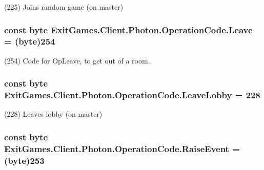(225) Joins random game (on master)

\subsubsection[{\texorpdfstring{Leave}{Leave}}]{\setlength{\rightskip}{0pt plus 5cm}const byte Exit\+Games.\+Client.\+Photon.\+Operation\+Code.\+Leave = (byte)254}\hypertarget{class_exit_games_1_1_client_1_1_photon_1_1_operation_code_aa11e391e152516015f509f474f6ac7ce}{}\label{class_exit_games_1_1_client_1_1_photon_1_1_operation_code_aa11e391e152516015f509f474f6ac7ce}


(254) Code for Op\+Leave, to get out of a room.

\subsubsection[{\texorpdfstring{Leave\+Lobby}{LeaveLobby}}]{\setlength{\rightskip}{0pt plus 5cm}const byte Exit\+Games.\+Client.\+Photon.\+Operation\+Code.\+Leave\+Lobby = 228}\hypertarget{class_exit_games_1_1_client_1_1_photon_1_1_operation_code_ac9483ca214470e195bd3b4558aee3a08}{}\label{class_exit_games_1_1_client_1_1_photon_1_1_operation_code_ac9483ca214470e195bd3b4558aee3a08}


(228) Leaves lobby (on master)

\subsubsection[{\texorpdfstring{Raise\+Event}{RaiseEvent}}]{\setlength{\rightskip}{0pt plus 5cm}const byte Exit\+Games.\+Client.\+Photon.\+Operation\+Code.\+Raise\+Event = (byte)253}\hypertarget{class_exit_games_1_1_client_1_1_photon_1_1_operation_code_a629f95f520a21f28345366d84d9171bf}{}\label{class_exit_games_1_1_client_1_1_photon_1_1_operation_code_a629f95f520a21f28345366d84d9171bf}


